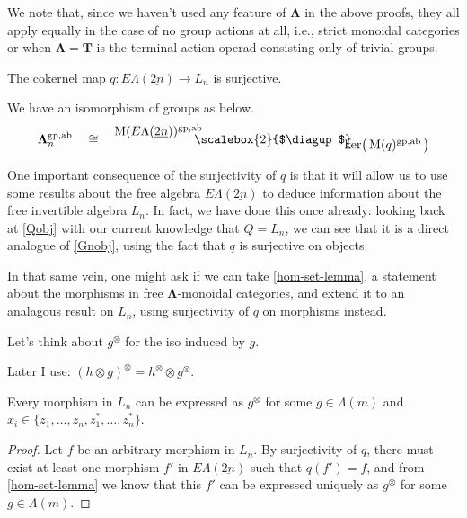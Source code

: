 \documentclass{amsbook} %
\newcommand{\mb}{\mathbf}
\newcommand{\ML}{\mathbf{\Lambda}}
\newcommand{\MLn}{\mathbf{\Lambda}_n}
\newcommand{\bigquotient}[2]{ \raisebox{0.75\height}{$#1$} \mkern-12mu\scalebox{2}{$\diagup$}\mkern-10mu \raisebox{-0.5\height}{$#2$} }
\newcommand{\EL}{E\Lambda}
\newcommand{\ELnn}{E\Lambda(\underline{2n})}
\numberwithin{section}{chapter}
\begin{document}
\begin{rem}\label{alsowithoutgroups}
We note that, since we haven't used any feature of $\ML$ in the above proofs, they all apply equally in the case of no group actions at all, i.e., strict monoidal categories or when $\ML = \mb{T}$ is the terminal action operad consisting only of trivial groups.
\end{rem}

\begin{cor}\label{qsurj} The cokernel map $q \colon  \EL(\underline{2n}) \to L_n$ is surjective.
\end{cor}

\begin{cor}\label{M_coker}
We have an isomorphism of groups as below.
\[ \MLn^{\mathrm{gp},\mathrm{ab}} \quad \cong \quad \bigquotient{\mathrm{M}(\ELnn)^{\mathrm{gp},\mathrm{ab}}}{\mathrm{ker}\big( \, \mathrm{M}(q)^{\mathrm{gp},\mathrm{ab}} \, \big)} \]
\end{cor}

One important consequence of the surjectivity of $q$ is that it will allow us to use some results about the free algebra $\ELnn$ to deduce information about the free invertible algebra $L_n$. In fact, we have done this once already: looking back at \cref{Qobj} with our current knowledge that $Q = L_n$, we can see that it is a direct analogue of \cref{Gnobj}, using the fact that $q$ is surjective on objects. 

In that same vein, one might ask if we can take \cref{hom-set-lemma}, a statement about the morphisms in free $\ML$-monoidal categories, and extend it to an analagous result on $L_n$, using surjectivity of $q$ on morphisms instead. 

\begin{nota}\label{newaction}
Let's think about $g^{\otimes}$ for the iso induced by $g$.
\end{nota}

\begin{lem}\label{otimesotimes}
Later I use: $(h \otimes g)^{\otimes} = h^{\otimes} \otimes g^{\otimes}$.
\end{lem}

\begin{prop} \label{allmapsaction} Every morphism in $L_n$ can be expressed as $g^{\otimes}$
for some $g \in \Lambda(m)$ and $x_i \in \{z_1, \ldots, z_n, z_1^*, \ldots, z_n^* \}$.
\end{prop}

\begin{proof}
Let $f$ be an arbitrary morphism in $L_n$. By surjectivity of $q$, there must exist at least one morphism $f'$ in $\ELnn$ such that $q(f') = f$, and from \cref{hom-set-lemma} we know that this $f'$ can be expressed uniquely as $g^{\otimes}$ for some $g \in \Lambda(m)$. 
\end{proof}
\end{document}
